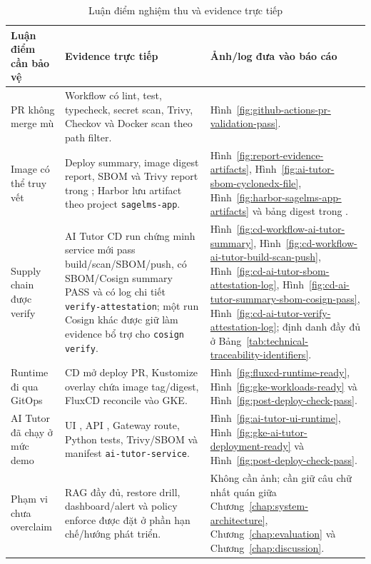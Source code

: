 \begin{table}[H]
\centering
\small
\caption{Luận điểm nghiệm thu và evidence trực tiếp}
\label{tab:claim-evidence-map}
\begin{tabularx}{\textwidth}{|p{}|Y|Y|}
\hline
\textbf{Luận điểm cần bảo vệ} & \textbf{Evidence trực tiếp} & \textbf{Ảnh/log đưa vào báo cáo} \\
\hline
PR không merge mù & Workflow  có lint, test, typecheck, secret scan, Trivy, Checkov và Docker scan theo path filter. & Hình~\ref{fig:github-actions-pr-validation-pass}. \\
Image có thể truy vết & Deploy summary, image digest report, SBOM và Trivy report trong ; Harbor lưu artifact theo project \texttt{sagelms-app}. & Hình~\ref{fig:report-evidence-artifacts}, Hình~\ref{fig:ai-tutor-sbom-cyclonedx-file}, Hình~\ref{fig:harbor-sagelms-app-artifacts} và bảng digest trong . \\
Supply chain được verify & AI Tutor CD run chứng minh service mới pass build/scan/SBOM/push, có SBOM/Cosign summary PASS và có log chi tiết \texttt{verify-attestation}; một run Cosign khác được giữ làm evidence bổ trợ cho \texttt{cosign verify}. & Hình~\ref{fig:cd-workflow-ai-tutor-summary}, Hình~\ref{fig:cd-workflow-ai-tutor-build-scan-push}, Hình~\ref{fig:cd-ai-tutor-sbom-attestation-log}, Hình~\ref{fig:cd-ai-tutor-summary-sbom-cosign-pass}, Hình~\ref{fig:cd-ai-tutor-verify-attestation-log}; định danh đầy đủ ở Bảng~\ref{tab:technical-traceability-identifiers}. \\
Runtime đi qua GitOps & CD mở deploy PR, Kustomize overlay chứa image tag/digest, FluxCD reconcile vào GKE. & Hình~\ref{fig:fluxcd-runtime-ready}, Hình~\ref{fig:gke-workloads-ready} và Hình~\ref{fig:post-deploy-check-pass}. \\
AI Tutor đã chạy ở mức demo & UI , API , Gateway route, Python tests, Trivy/SBOM và manifest \texttt{ai-tutor-service}. & Hình~\ref{fig:ai-tutor-ui-runtime}, Hình~\ref{fig:gke-ai-tutor-deployment-ready} và Hình~\ref{fig:post-deploy-check-pass}. \\
Phạm vi chưa overclaim & RAG đầy đủ, restore drill, dashboard/alert và policy enforce được đặt ở phần hạn chế/hướng phát triển. & Không cần ảnh; cần giữ câu chữ nhất quán giữa Chương~\ref{chap:system-architecture}, Chương~\ref{chap:evaluation} và Chương~\ref{chap:discussion}. \\
\hline
\end{tabularx}
\end{table}

